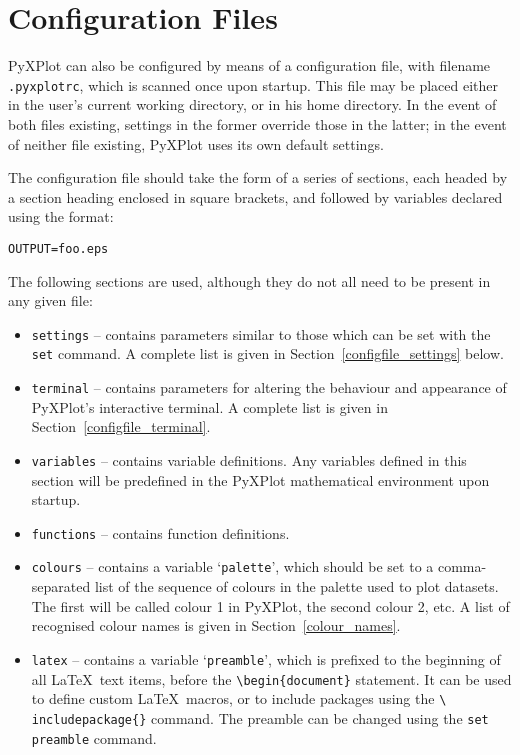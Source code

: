 \documentclass[a4paper,onecolumn,11pt]{book}
\begin{document}
\section{Configuration Files}
\label{config_files}

PyXPlot can also be configured by means of a configuration file, with filename
\texttt{.pyxplotrc}, which is scanned once upon startup. This file may be
placed either in the user's current working directory, or in his home
directory. In the event of both files existing, settings in the former override
those in the latter; in the event of neither file existing, PyXPlot uses its
own default settings.

The configuration file should take the form of a series of sections, each
headed by a section heading enclosed in square brackets, and followed by
variables declared using the format:

\begin{verbatim} 
OUTPUT=foo.eps
\end{verbatim}

The following sections are used, although they do not all need to be present in
any given file:

\begin{itemize}
\item \texttt{settings} -- contains parameters similar to those which can be set with the \texttt{set} command. A complete list is given in Section~\ref{configfile_settings} below.
\item \texttt{terminal} -- contains parameters for altering the behaviour and appearance of PyXPlot's interactive terminal. A complete list is given in Section~\ref{configfile_terminal}.
\item \texttt{variables} -- contains variable definitions. Any variables defined in this section will be predefined in the PyXPlot mathematical environment upon startup.
\item \texttt{functions} -- contains function definitions.
\item \texttt{colours} -- contains a variable `\texttt{palette}', which should be set to a comma-separated list of the sequence of colours in the palette used to plot datasets. The first will be called colour 1 in PyXPlot, the second colour 2, etc. A list of recognised colour names is given in Section~\ref{colour_names}.
\item \texttt{latex} -- contains a variable `\texttt{preamble}', which is
prefixed to the beginning of all \LaTeX\ text items, before the
\texttt{\textbackslash begin\{document\}} statement. It can be used to define
custom \LaTeX\ macros, or to include packages using the \texttt{\textbackslash
includepackage\{\}} command.  The preamble can be changed using the {\tt set
preamble} command.
\end{itemize}
\end{document}
